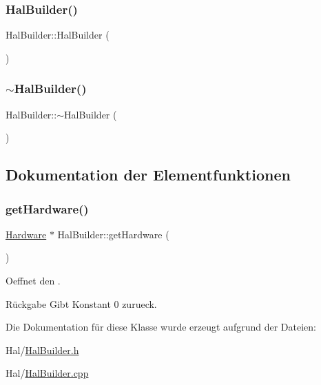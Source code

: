 \subsubsection{\texorpdfstring{Hal\+Builder()}{HalBuilder()}}
{\footnotesize\ttfamily Hal\+Builder\+::\+Hal\+Builder (\begin{DoxyParamCaption}{ }\end{DoxyParamCaption})}

\hypertarget{class_hal_builder_af77e28e213c8aa028b18cf435e9ef3c8}{}\label{class_hal_builder_af77e28e213c8aa028b18cf435e9ef3c8} 
\subsubsection{\texorpdfstring{$\sim$\+Hal\+Builder()}{~HalBuilder()}}
{\footnotesize\ttfamily Hal\+Builder\+::$\sim$\+Hal\+Builder (\begin{DoxyParamCaption}{ }\end{DoxyParamCaption})\hspace{0.3cm}{\ttfamily [virtual]}}



\subsection{Dokumentation der Elementfunktionen}
\hypertarget{class_hal_builder_addc8f400dfa9dee3f0d9de116512212f}{}\label{class_hal_builder_addc8f400dfa9dee3f0d9de116512212f} 
\subsubsection{\texorpdfstring{get\+Hardware()}{getHardware()}}
{\footnotesize\ttfamily \hyperlink{class_hardware}{Hardware} $\ast$ Hal\+Builder\+::get\+Hardware (\begin{DoxyParamCaption}{ }\end{DoxyParamCaption})}

Oeffnet den .

\begin{DoxyReturn}{Rückgabe}
Gibt Konstant 0 zurueck. 
\end{DoxyReturn}


Die Dokumentation für diese Klasse wurde erzeugt aufgrund der Dateien\+:\begin{DoxyCompactItemize}
\item 
Hal/\hyperlink{_hal_builder_8h}{Hal\+Builder.\+h}\item 
Hal/\hyperlink{_hal_builder_8cpp}{Hal\+Builder.\+cpp}\end{DoxyCompactItemize}
